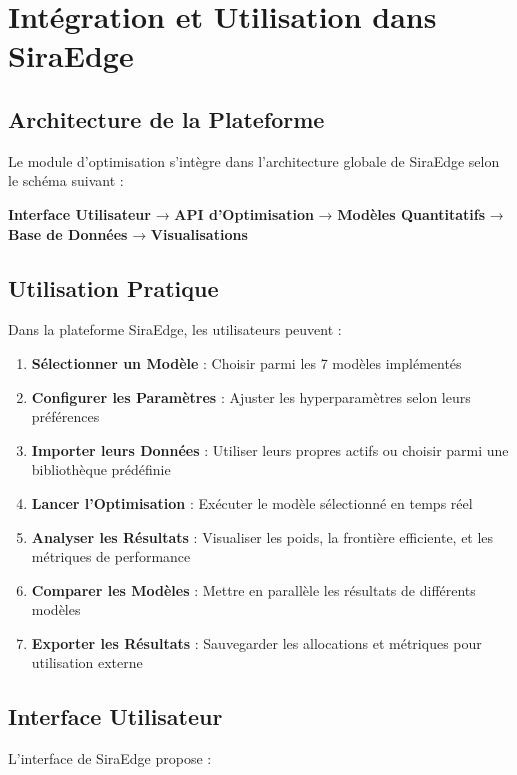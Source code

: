 \documentclass[11pt,a4paper]{article}
\begin{document}
\section{Intégration et Utilisation dans SiraEdge}

\subsection{Architecture de la Plateforme}
Le module d'optimisation s'intègre dans l'architecture globale de SiraEdge selon le schéma suivant :

\begin{center}
\begin{tcolorbox}[title=Architecture SiraEdge - Module d'Optimisation]
\textbf{Interface Utilisateur} → \textbf{API d'Optimisation} → \textbf{Modèles Quantitatifs} → \textbf{Base de Données} → \textbf{Visualisations}
\end{tcolorbox}
\end{center}

\subsection{Utilisation Pratique}
Dans la plateforme SiraEdge, les utilisateurs peuvent :

\begin{enumerate}
\item \textbf{Sélectionner un Modèle} : Choisir parmi les 7 modèles implémentés
\item \textbf{Configurer les Paramètres} : Ajuster les hyperparamètres selon leurs préférences
\item \textbf{Importer leurs Données} : Utiliser leurs propres actifs ou choisir parmi une bibliothèque prédéfinie
\item \textbf{Lancer l'Optimisation} : Exécuter le modèle sélectionné en temps réel
\item \textbf{Analyser les Résultats} : Visualiser les poids, la frontière efficiente, et les métriques de performance
\item \textbf{Comparer les Modèles} : Mettre en parallèle les résultats de différents modèles
\item \textbf{Exporter les Résultats} : Sauvegarder les allocations et métriques pour utilisation externe
\end{enumerate}

\subsection{Interface Utilisateur}
L'interface de SiraEdge propose :
\end{document}
